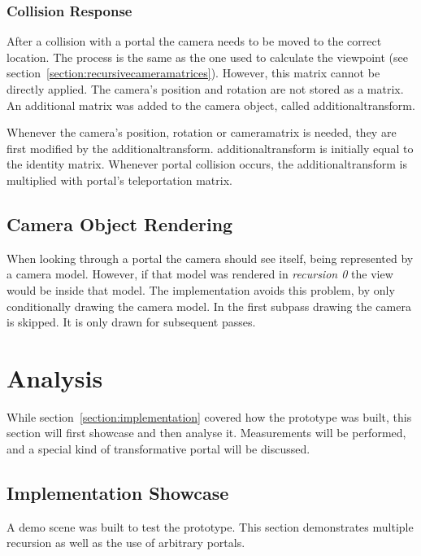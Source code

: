 \subsection{Collision Response}

After a collision with a portal the camera needs to be moved to the correct location. The process is the same as the one used to calculate the viewpoint (see section~\ref{section:recursivecameramatrices}). However, this matrix cannot be directly applied. The camera's position and rotation are not stored as a matrix. An additional matrix was added to the camera object, called \gls{additionaltransform}.

Whenever the camera's position, rotation or \gls{cameramatrix} is needed, they are first modified by the \gls{additionaltransform}. \gls{additionaltransform} is initially equal to the identity matrix. Whenever portal collision occurs, the \gls{additionaltransform} is multiplied with portal's teleportation matrix.



\section{Camera Object Rendering}
When looking through a portal the camera should see itself, being represented by a camera model. However, if that model was rendered in \textit{recursion 0} the view would be inside that model. The implementation avoids this problem, by only conditionally drawing the camera model. In the first subpass drawing the camera is skipped. It is only drawn for subsequent passes.




\chapter{Analysis}
While section~\ref{section:implementation} covered how the prototype was built, this section will first showcase and then analyse it. Measurements will be performed, and a special kind of transformative portal will be discussed.

\section{Implementation Showcase}

A demo scene was built to test the prototype. This section demonstrates multiple recursion as well as the use of arbitrary portals.

